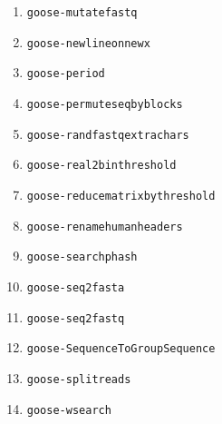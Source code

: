 \begin{enumerate}
\item \texttt{goose-mutatefastq}
\item \texttt{goose-newlineonnewx}
\item \texttt{goose-period}
\item \texttt{goose-permuteseqbyblocks}

\item \texttt{goose-randfastqextrachars}

\item \texttt{goose-real2binthreshold}
\item \texttt{goose-reducematrixbythreshold}
\item \texttt{goose-renamehumanheaders}

\item \texttt{goose-searchphash}

\item \texttt{goose-seq2fasta}
\item \texttt{goose-seq2fastq}
\item \texttt{goose-SequenceToGroupSequence}
\item \texttt{goose-splitreads}

\item \texttt{goose-wsearch}
\end{enumerate}



%




%
%
%

%
%
%
%
%
%
%
%
%
%
%
%
%
%
%
%
%
%
%
%
%
%
%
%
%
%
%
